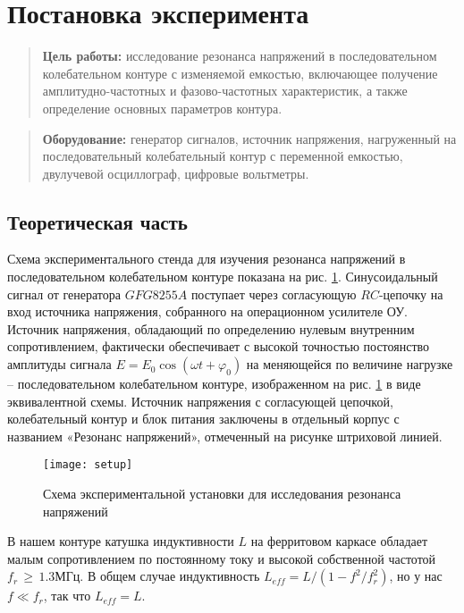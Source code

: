 \documentclass{lab}
\begin{document}


\section*{Постановка эксперимента}

\begin{quote}
\textbf{{\normalsize Цель работы: }}
исследование резонанса напряжений в последовательном колебательном контуре с
изменяемой емкостью, включающее получение амплитудно-частотных и фазово-частотных
характеристик, а также определение основных параметров контура.
\end{quote}

\begin{quote}
\textbf{{\normalsize Оборудование: }}
генератор сигналов, источник напряжения, нагруженный на последовательный колебательный
контур с переменной емкостью, двулучевой осциллограф, цифровые вольтметры.
\end{quote}

\subsection*{Теоретическая часть}

Схема экспериментального стенда для изучения резонанса напряжений в последовательном
колебательном контуре показана на рис. \ref{setup}. Синусоидальный сигнал от генератора
$GFG8255A$ поступает через согласующую $RC$-цепочку на вход источника напряжения,
собранного на операционном усилителе ОУ. Источник напряжения, обладающий по определению
нулевым внутренним сопротивлением, фактически обеспечивает с высокой точностью
постоянство амплитуды сигнала $ E = E_0 \cos (\omega t + \varphi_0) $ на меняющейся по
величине нагрузке -- последовательном колебательном контуре, изображенном на
рис. \ref{setup} в виде эквивалентной схемы. Источник напряжения с согласующей цепочкой,
колебательный контур и блок питания заключены в отдельный корпус с названием
«Резонанс напряжений», отмеченный на рисунке штриховой линией.

\begin{figure}[H]
	\centering
	\texttt{[image: setup]}
	\caption{\footnotesize
	Схема экспериментальной установки для исследования резонанса напряжений
	}
	\label{setup}
\end{figure}

В нашем контуре катушка индуктивности $ L $ на ферритовом каркасе обладает малым
сопротивлением по постоянному току и высокой собственной частотой
$ f_r\,\geq\,1.3 МГц$. В общем случае индуктивность $ L_{eff} = L/(1-f^2/f_r^2) $,
но у нас $ f \ll f_r $, так что $ L_{eff} = L $.\\
\end{document}
